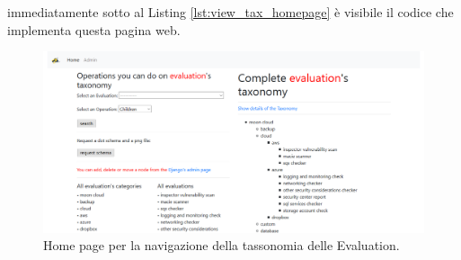 immediatamente sotto al Listing \ref{lst:view_tax_homepage} è visibile il codice che implementa questa pagina web.\hfill\break
%
\begin{figure}[ht!]
    \includegraphics[scale=0.3]{images/MCRS_taxindex.png}
    \caption{Home page per la navigazione della tassonomia delle Evaluation.}
    \label{fig:MCRS_taxindex}
\end{figure}
%
\lstset{style=python_code_style}
